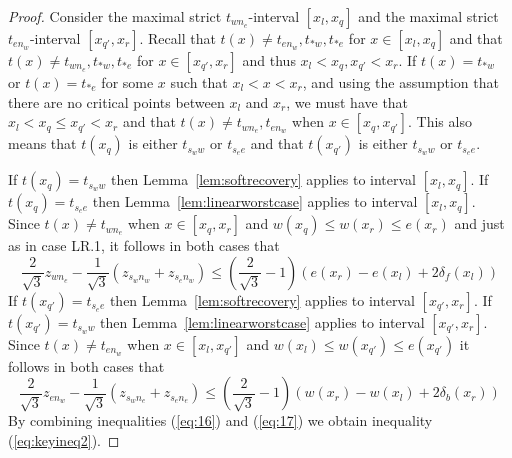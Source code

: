 \begin{proof}
Consider the maximal strict $t_{wn_e}$-interval $[x_l,x_q]$ and the maximal
strict $t_{en_w}$-interval $[x_{q'},x_r]$. Recall that $t(x) \not= t_{en_w},t_{\ast w},t_{\ast e}$ for $x \in [x_l,x_q]$ and that $t(x) \not= t_{wn_e},t_{\ast w},t_{\ast e}$ for $x \in [x_{q'},x_r]$ and thus $x_l < x_q,x_{q'} < x_r$. 
If $t(x) = t_{\ast w}$ or $t(x) = t_{\ast e}$ 
for  some $x$ such that $x_l < x < x_r$, and using the assumption that there
are no critical points between $x_l$ and $x_r$, we must have that 
$x_l < x_q \leq x_{q'} < x_r$ and that $t(x) \not= t_{wn_e},t_{en_w}$ when
$x \in [x_q,x_{q'}]$. This also means that $t(x_q)$ is either $t_{s_ww}$ or 
$t_{s_ee}$ and that $t(x_{q'})$ is either $t_{s_ww}$ or $t_{s_ee}$. 

If $t(x_q)=t_{s_ww}$ then Lemma~\ref{lem:softrecovery} applies to interval
$[x_l,x_q]$. If $t(x_q) = t_{s_ee}$ then Lemma~\ref{lem:linearworstcase} applies
to interval $[x_l,x_q]$. Since $t(x) \not= t_{wn_e}$ when $x \in [x_q, x_r]$ 
and $w(x_q) \leq w(x_r) \leq e(x_r)$ and just as in case LR.1, it follows in 
both cases that
\begin{equation}
\label{eq:16}
\frac{2}{\sqrt{3}} z_{wn_e} - \frac{1}{\sqrt{3}}(z_{s_wn_w} + z_{s_en_w}) \leq \left(\frac{2}{\sqrt{3}} - 1\right) (e(x_r) - e(x_l) + 2 \delta_f(x_l))
\end{equation}
If $t(x_{q'})=t_{s_ee}$ then Lemma~\ref{lem:softrecovery}
applies to interval $[x_{q'},x_r]$. If $t(x_{q'}) = t_{s_ww}$ then Lemma~\ref{lem:linearworstcase} applies to interval $[x_{q'},x_r]$. Since $t(x) \not= t_{en_w}$ when $x \in [x_l, x_{q'}]$ and $w(x_l) \leq w(x_{q'}) \leq e(x_{q'})$ it follows 
in both cases that
\begin{equation}
\label{eq:17} 
\frac{2}{\sqrt{3}} z_{en_w} - \frac{1}{\sqrt{3}}(z_{s_wn_e} + z_{s_en_e}) \leq \left(\frac{2}{\sqrt{3}} - 1\right) (w(x_r) - w(x_l) + 2 \delta_b(x_r))
\end{equation}
By combining inequalities (\ref{eq:16}) and (\ref{eq:17}) we obtain inequality 
(\ref{eq:keyineq2}).


\end{proof}
